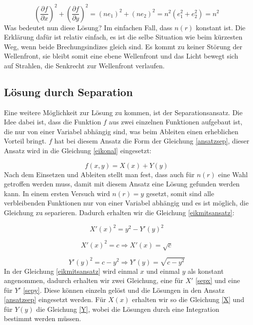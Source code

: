\begin{refsection}
\begin{equation}\label{lösung_eik}
\left( \dfrac{\partial f}{\partial x}\right)^{2} + \left( \dfrac{\partial f}{\partial y}\right) ^{2} = \left( ne_{1}\right) ^{2}+\left( ne_{2}\right)^{2}=n^{2}(e_{1}^{2}+e_{2}^{2})=n^{2}
\end{equation}
Was bedeutet nun diese Lösung? Im einfachen Fall, dass $n(r)$ konstant ist. Die Erklärung dafür ist relativ einfach, es ist die selbe Situation wie beim kürzesten Weg, wenn beide Brechungsindizes gleich sind. Es kommt zu keiner Störung der Wellenfront, sie bleibt somit eine ebene Wellenfront und das Licht bewegt sich auf Strahlen, die Senkrecht zur Wellenfront verlaufen.

\subsection{Lösung durch Separation}
Eine weitere Möglichkeit zur Lösung zu kommen, ist der Separationsansatz. Die Idee dabei ist, dass die Funktion $f$ aus zwei einzelnen Funktionen aufgebaut ist, die nur von einer Variabel abhängig sind, was beim Ableiten einen erheblichen Vorteil bringt. $f$ hat bei diesem Ansatz die Form der Gleichung \eqref{ansatzsep}, dieser Ansatz wird in die Gleichung \eqref{eikonal} eingesetzt:  

\begin{equation}\label{ansatzsep}
f(x,y)=X(x) + Y(y)
\end{equation}
Nach dem Einsetzen und Ableiten stellt man fest, dass auch für $n(r)$ eine Wahl getroffen werden muss, damit mit diesem Ansatz eine Lösung gefunden werden kann. In einem ersten Versuch wird $n(r)=y$ gesetzt, somit sind alle verbleibenden Funktionen nur von einer Variabel abhängig und es ist möglich, die Gleichung zu separieren. Dadurch erhalten wir die Gleichung \eqref{eikmitsansatz}:

\begin{equation}\label{eikmitsansatz}
X'(x)^{2}=y^{2}-Y'(y)^{2}
\end{equation}

\begin{equation}\label{sepx}
X'(x)^{2}=c \Rightarrow X'(x)=\sqrt{c}
\end{equation}

\begin{equation}\label{sepy}
Y'(y)^{2}=c-y^{2}  \Rightarrow Y'(y)=\sqrt{c-y^{2}}
\end{equation}
In der Gleichung \eqref{eikmitsansatz} wird einmal $x$ und einmal $y$ als konstant angenommen, dadurch erhalten wir zwei Gleichung, eine für $X'$ \eqref{sepx} und eine für $Y'$ \eqref{sepy}. Diese können einzeln gelöst und die Lösungen in den Ansatz \eqref{ansatzsep} eingesetzt werden. Für $X(x)$ erhalten wir so die Gleichung \eqref{X} und für $Y(y)$ die Gleichung \eqref{Y}, wobei die Lösungen durch eine Integration bestimmt werden müssen.


\end{refsection}
